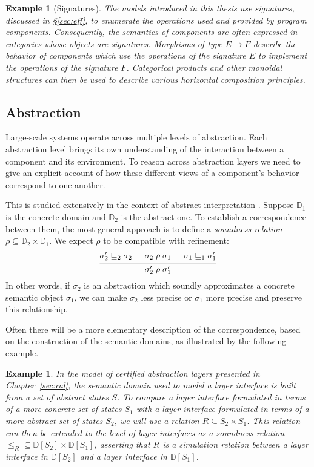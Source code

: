 \documentclass[11pt,oneside,draft]{book}
\newtheorem{example}[theorem]{Example}
\theoremstyle{definition}
\newcommand{\refby}{\sqsubseteq} %
\begin{document}
\begin{example}[Signatures] %
The models introduced in this thesis use \emph{signatures},
discussed in \S\ref{sec:eff},
to enumerate the operations used and provided by program components.
Consequently,
the semantics of components are often expressed in categories
whose objects are signatures.
Morphisms of type $E \rightarrow F$
describe the behavior of components
which use the operations of the signature $E$
to implement the operations of the signature $F$.
Categorical products and other monoidal structures
can then be used to describe various
horizontal composition principles.
\end{example}


\subsection{Abstraction} %

Large-scale systems operate across multiple levels of abstraction.
Each abstraction level brings its own understanding of the interaction
between a component and its environment.
To reason across abstraction layers we need to give
an explicit account of how these different views
of a component's behavior
correspond to one another.

This is studied extensively
in the context of abstract interpretation \citep{aif}.
Suppose $\mathbb{D}_1$ is the concrete domain
and $\mathbb{D}_2$ is the abstract one.
To establish a correspondence between them,
the most general approach is to define a \emph{soundness relation}
$\rho \subseteq \mathbb{D}_2 \times \mathbb{D}_1$.
We expect $\rho$
to be compatible with refinement:
\[
  \begin{prooftree}
    \hypo{\sigma_2' \refby_2 \sigma_2}
    \hypo{\sigma_2 \mathrel{\rho} \sigma_1}
    \hypo{\sigma_1 \refby_1 \sigma_1'}
    \infer3{\sigma_2' \mathrel{\rho} \sigma_1'}
  \end{prooftree}
\]
In other words,
if $\sigma_2$ is an abstraction which soundly approximates
a concrete semantic object $\sigma_1$,
we can make $\sigma_2$ less precise or $\sigma_1$ more precise
and preserve this relationship.

Often there will be a more elementary description
of the correspondence,
based on the construction of the semantic domains,
as illustrated by the following example.

\begin{example} %
In the model of \emph{certified abstraction layers}
presented in Chapter~\ref{sec:cal},
the semantic domain used to model a layer interface
is built from a set of abstract states $S$.
To compare a layer interface formulated in terms of
a more concrete set of states $S_1$ with
a layer interface formulated in terms of
a more abstract set of states $S_2$,
we will use a relation $R \subseteq S_2 \times S_1$.
This relation can then be extended to the level of layer interfaces
as a soundness relation
${\le_R} \subseteq \mathbb{D}[S_2] \times \mathbb{D}[S_1]$,
asserting that $R$ is a simulation relation between
a layer interface in $\mathbb{D}[S_2]$ and
a layer interface in $\mathbb{D}[S_1]$.
\end{example}
\end{document}
